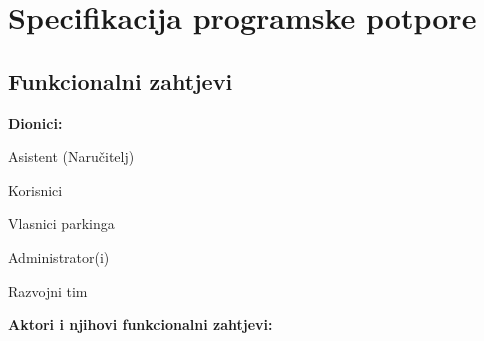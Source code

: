 \chapter{Specifikacija programske potpore}
		
	\section{Funkcionalni zahtjevi}
			
			
		
			
			\noindent \textbf{Dionici:}
			
			\begin{packed_enum}
				
				\item Asistent (Naručitelj)
				\item Korisnici				
				\item Vlasnici parkinga
				\item Administrator(i)
				\item Razvojni tim
				
			\end{packed_enum}
			
			\noindent \textbf{Aktori i njihovi funkcionalni zahtjevi:}
			
